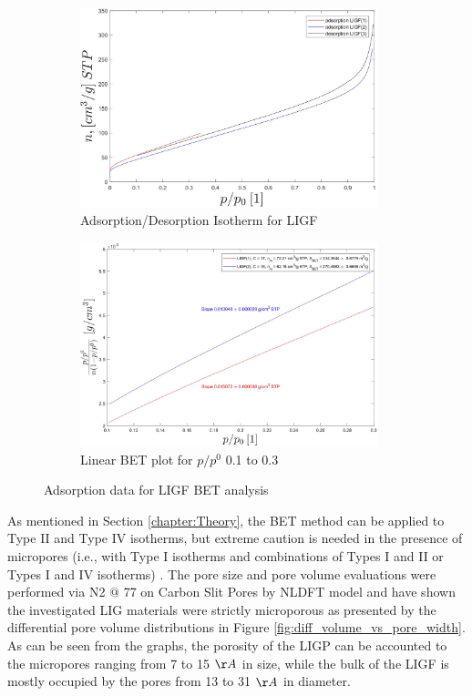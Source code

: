 \begin{figure}[H]
\begin{subfigure}{0.51\textwidth}
\includegraphics[width=0.95\textwidth]{Figures/Results/LIGF_Adsorption_Desorption_Isotherms.jpg} 
\captionsetup{width=0.9\linewidth}
\caption{Adsorption/Desorption Isotherm for LIGF}
\label{fig:LIGF_BET_Ads_Des}
\end{subfigure}
\begin{subfigure}{0.48\textwidth}
\includegraphics[width=0.95\textwidth]{Figures/Results/LIGF_BET_plots.jpg}
\captionsetup{width=0.9\linewidth}
\caption{Linear BET plot for $p/p^0$ 0.1 to 0.3}
\label{fig:LIGF_BET_plot}
\end{subfigure}
\medskip
\caption{Adsorption data for LIGF BET analysis}
\label{fig:LIGF_BET}
\end{figure}


As mentioned in Section \ref{chapter:Theory}, the BET method can be applied to  Type II and Type IV isotherms, but extreme caution is needed in the presence of micropores (i.e., with Type I isotherms and combinations of Types I and II or Types I and IV isotherms) \cite{thommes_physisorption_2015}. The pore size and pore volume evaluations were performed via N2 $@$ 77 on Carbon Slit Pores by NLDFT model \cite{NLDFT} and have shown the investigated LIG materials were strictly microporous as presented by the differential pore volume distributions in Figure \ref{fig:diff_volume_vs_pore_width}. As can be seen from the graphs, the porosity of the LIGP can be accounted to the micropores ranging from 7 to 15 $\AA$ in size, while the bulk of the LIGF is mostly occupied by the pores from 13 to 31 $\AA$ in diameter. 

